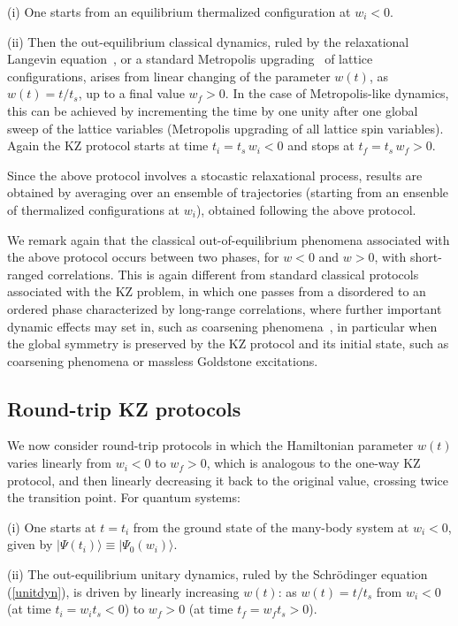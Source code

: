 (i) One starts from an equilibrium thermalized configuration at $w_i <
0$.
  
(ii) Then the out-equilibrium classical dynamics, ruled by the
relaxational Langevin equation~\cite{HH-77}, or a standard Metropolis
upgrading~\cite{Metropolis:1953am} of lattice configurations, arises
from linear changing of the parameter $w(t)$, as $w(t) = t/t_s$, up to
a final value $w_f>0$.  In the case of Metropolis-like dynamics, this
can be achieved by incrementing the time by one unity after one global
sweep of the lattice variables (Metropolis upgrading of all lattice
spin variables).  Again the KZ protocol starts at time $t_i = t_s \,
w_i<0$ and stops at $t_f= t_s \, w_f>0$.

Since the above protocol involves a stocastic relaxational
process, results are obtained by averaging over an ensemble of
trajectories (starting from an ensenble of thermalized configurations
at $w_i$), obtained following the above protocol.

We remark again that the classical out-of-equilibrium phenomena
associated with the above protocol occurs between two phases, for
$w<0$ and $w>0$, with short-ranged correlations.  This is again
different from standard classical protocols associated with the KZ
problem, in which one passes from a disordered to an ordered phase
characterized by long-range correlations, where further important dynamic
effects may set in, such as coarsening phenomena~\cite{chandran2012kibble},
in particular when the global symmetry is preserved by the KZ protocol
and its initial state, such as coarsening phenomena or massless
Goldstone excitations.



\subsection{Round-trip KZ protocols}
\label{rtpro}


We now consider round-trip protocols in which the Hamiltonian
parameter $w(t)$ varies linearly from $w_i<0$ to $w_f>0$, which is
analogous to the one-way KZ protocol, and then linearly decreasing it
back to the original value, crossing twice the transition point. For
quantum systems:

(i) One starts at $t=t_i$ from the ground state of the many-body
system at $w_i < 0$, given by $|\Psi(t_i)\rangle \equiv
|\Psi_0(w_i)\rangle$.
  
(ii) The out-equilibrium unitary dynamics, ruled by the Schr\"odinger
equation (\ref{unitdyn}), is driven by linearly increasing $w(t)$: as
$w(t) = t/t_s$ from $w_i<0$ (at time $t_i=w_i t_s<0$) to $w_f>0$ (at
time $t_f = w_f t_s>0$).

